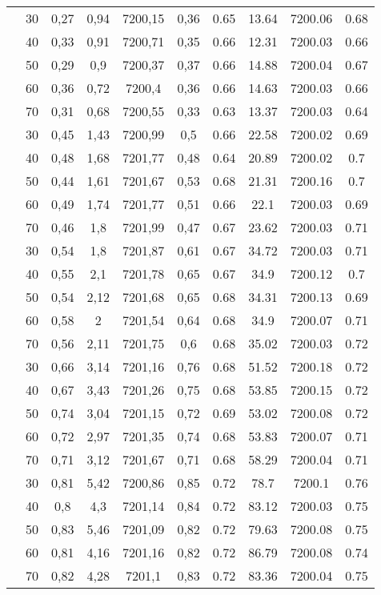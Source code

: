 \begin{table}[!h]
\begin{tabular}{|c|c|c c c c|c c c c|}
\hline
\multirow{5}{*}{\midrule 9} 
& 30 &	0,27 &	0,94 &	7200,15 &	0,36 &	0.65 &	13.64 &	7200.06 &	0.68\\
& 40 &	0,33 &	0,91  &	7200,71 &	0,35 &	0.66 &	12.31 &	7200.03 &	0.66\\
& 50 &	0,29 &	0,9  &	7200,37 &	0,37 &	0.66 &	14.88 &	7200.04 &	0.67\\
& 60 &	0,36 &	0,72  &	7200,4 &	0,36 &	0.66 &	14.63 &	7200.03 &	0.66\\
& 70 &	0,31 &	0,68  &	7200,55 &	0,33 &	0.63 &	13.37 &	7200.03 &	0.64\\
\hline
\multirow{5}{*}{\midrule 10} 
& 30 &	0,45 &	1,43 &	7200,99 &	0,5  &	0.66 &	22.58 &	7200.02 &	0.69\\
& 40 &	0,48 &	1,68 &	7201,77 &	0,48 &	0.64 &	20.89 &	7200.02 &	0.7\\
& 50 &	0,44 &	1,61 &	7201,67 &	0,53 &	0.68 &	21.31 &	7200.16 &	0.7\\
& 60 &	0,49 &	1,74&	7201,77 &	0,51 &	0.66 &	22.1 &	7200.03 &	0.69\\
& 70 &	0,46 &	1,8 &	7201,99 &	0,47 &	0.67 &	23.62 &	7200.03 &	0.71\\
\hline
\multirow{5}{*}{\midrule 11} 
& 30 &	0,54 &	1,8 &	7201,87 &	0,61 &	0.67 &	34.72 &	7200.03 &	0.71\\
& 40 &	0,55 &	2,1 &	7201,78 &	0,65 &	0.67 &	34.9 &	7200.12 &	0.7\\
& 50 &	0,54 &	2,12 &	7201,68&	0,65 &	0.68 &	34.31 &	7200.13 &	0.69\\
& 60 &	0,58 &	2    &	7201,54 &	0,64 &	0.68 &	34.9 &	7200.07 &	0.71\\
& 70 &	0,56 &	2,11 &	7201,75 &	0,6 &	0.68 &	35.02 &	7200.03 &	0.72\\
\hline
\multirow{5}{*}{\midrule 12} 
& 30 &	0,66 &	3,14 &	7201,16 &	0,76 &	0.68 &	51.52 &	7200.18 &	0.72\\
& 40 &	0,67 &	3,43 &	7201,26 &	0,75 &	0.68 &	53.85 &	7200.15 &	0.72\\
& 50 &	0,74 &	3,04 &	7201,15 &	0,72 &	0.69 &	53.02 &	7200.08 &	0.72\\
& 60 &	0,72 &	2,97 &	7201,35 &	0,74 &	0.68 &	53.83 &	7200.07 &	0.71\\
& 70 &	0,71 &	3,12 &	7201,67 &	0,71 &	0.68 &	58.29 &	7200.04 &	0.71\\

\hline\multirow{5}{*}{\midrule 13} 
& 30 &  0,81  &	5,42 &	7200,86 &	0,85 &  0.72  &	78.7  &	7200.1  &	0.76\\
& 40 &	0,8   &	4,3 &	7201,14 &	0,84 &  0.72  &	83.12 &	7200.03 &	0.75\\
& 50 &	0,83  &	5,46 &	7201,09 &	0,82 &	0.72 &	79.63 &	7200.08 &	0.75\\
& 60 &	0,81  &	4,16 &	7201,16 &	0,82 &	0.72 &	86.79 &	7200.08 &	0.74\\
& 70 &	0,82  &	4,28 &	7201,1 &	0,83 &	0.72 &	83.36 &	7200.04 &	0.75\\


\end{tabular}
\end{table}
